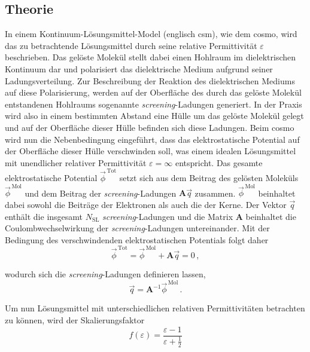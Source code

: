 	\subsection{Theorie}\label{kap:cosmotheo}
	In einem Kontinuum-Lösungsmittel-Model (englisch \ac{csm}), wie dem \ac{cosmo}, wird das zu betrachtende Lösungsmittel durch seine relative Permittivität $\varepsilon$ beschrieben. Das gelöste Molekül stellt dabei einen Hohlraum im dielektrischen Kontinuum dar und polarisiert das dielektrische Medium aufgrund seiner Ladungsverteilung. Zur Beschreibung der Reaktion des dielektrischen Mediums auf diese Polarisierung, werden auf der Oberfläche des durch das gelöste Molekül entstandenen Hohlraums sogenannte \textit{screening}-Ladungen generiert. In der Praxis wird also in einem bestimmten Abstand eine Hülle um das gelöste Molekül gelegt und auf der Oberfläche dieser Hülle befinden sich diese Ladungen. Beim \ac{cosmo} wird nun die Nebenbedingung eingeführt, dass das elektrostatische Potential auf der Oberfläche dieser Hülle verschwinden soll, was einem idealen Lösungsmittel mit unendlicher relativer Permittivität $\varepsilon=\infty$ entspricht. Das gesamte elektrostatische Potential $\vec{\phi}^{\,\textrm{Tot}}$ setzt sich aus dem Beitrag des gelösten Moleküls $\vec{\phi}^{\,\textrm{Mol}}$ und dem Beitrag der \textit{screening}-Ladungen $\boldsymbol{A}\vec{q}$ zusammen. $\vec{\phi}^{\,\textrm{Mol}}$ beinhaltet dabei sowohl die Beiträge der Elektronen als auch die der Kerne. Der Vektor $\vec{q}$ enthält die insgesamt $N_{\textrm{SL}}$ \textit{screening}-Ladungen und die Matrix $\boldsymbol{A}$ beinhaltet die Coulombwechselwirkung der \textit{screening}-Ladungen untereinander. Mit der Bedingung des verschwindenden elektrostatischen Potentials folgt daher
	\begin{equation}
	\vec{\phi}^{\,\textrm{Tot}}=\vec{\phi}^{\,\textrm{Mol}}+\boldsymbol{A}\vec{q}=0\, ,
	\end{equation}
	
wodurch sich die \textit{screening}-Ladungen definieren lassen,
	\begin{equation}
	\vec{q}=\boldsymbol{A}^{-1}\vec{\phi}^{\,\textrm{Mol}}\, .
	\end{equation}
	
Um nun Lösungsmittel mit unterschiedlichen relativen Permittivitäten betrachten zu können, wird der Skalierungsfaktor 
	\begin{equation}
	f(\varepsilon)=\frac{\varepsilon-1}{\varepsilon+\frac{1}{2}}
	\end{equation}
	
